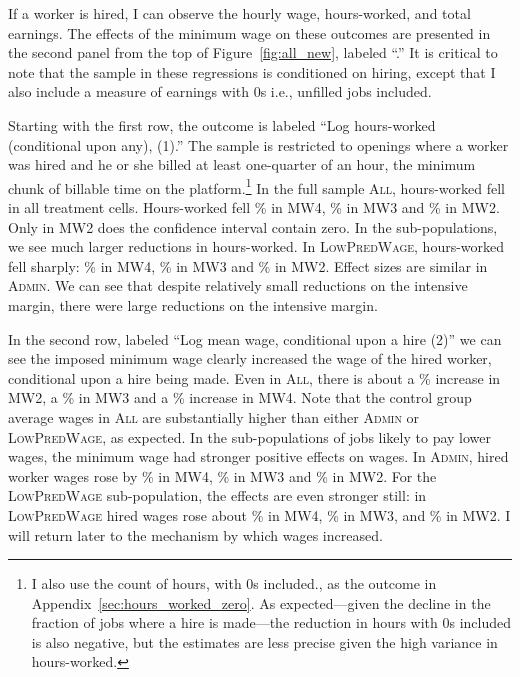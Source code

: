 \documentclass[AER]{AEA}
\newcommand{\all}{\textsc{All}}
\newcommand{\admin}{\textsc{Admin}}
\newcommand{\lpw}{\textsc{LowPredWage}}
\begin{document}
If a worker is hired, I can observe the hourly wage, hours-worked, and total earnings.
The effects of the minimum wage on these outcomes are presented in the second panel from the top of Figure~\ref{fig:all_new}, labeled ``\panelB{}.''
It is critical to note that the sample in these regressions is conditioned on hiring, except that I also include a measure of earnings with 0s i.e., unfilled jobs included.

Starting with the first row, the outcome is labeled ``Log hours-worked (conditional upon any), (1).'' 
The sample is restricted to openings where a worker was hired and he or she billed at least one-quarter of an hour, the minimum chunk of billable time on the platform.\footnote{ 
  I also use the count of hours, with 0s included., as the outcome in Appendix~\ref{sec:hours_worked_zero}.
  As expected---given the decline in the fraction of jobs where a hire is made---the reduction in hours with 0s included is also negative, but the estimates are less precise given the high variance in hours-worked.
}
In the full sample \all{}, hours-worked fell in all treatment cells.
Hours-worked fell \ALLFourloghourspctchange{}\% in MW4, \ALLThreeloghourspctchange{}\% in MW3 and \ALLTwologhourspctchange{}\% in MW2.
Only in MW2 does the confidence interval contain zero.
In the sub-populations, we see much larger reductions in hours-worked.
In \lpw{}, hours-worked fell sharply: \LPWFourloghourspctchange{}\% in MW4,
\LPWThreeloghourspctchange{}\% in MW3 and \LPWTwologhourspctchange{}\% in MW2.
Effect sizes are similar in \admin{}.
We can see that despite relatively small reductions on the intensive
margin, there were large reductions on the intensive margin.


In the second row, labeled ``Log mean wage, conditional upon a hire (2)'' we can see the imposed minimum wage clearly increased the wage of the hired worker, conditional upon a hire being made. 
Even in \all{}, there is about a \ALLTwologmeanwageovercontractpctchange{}\% increase in MW2, a \ALLThreelogmeanwageovercontractpctchange{}\% in MW3 and a \ALLFourlogmeanwageovercontractpctchange{}\% increase in MW4.
Note that the control group average wages in \all{} are substantially higher than either \admin{} or \lpw{}, as expected.
In the sub-populations of jobs likely to pay lower wages, the minimum wage had stronger positive effects on wages.
In \admin{}, hired worker wages rose by \ADMINFourlogmeanwageovercontractpctchange{}\% in MW4,
\ADMINThreelogmeanwageovercontractpctchange{}\% in MW3 and 
\ADMINTwologmeanwageovercontractpctchange{}\% in MW2.
For the \lpw{} sub-population, the effects are even stronger still: in \lpw{}
hired wages rose about \LPWFourlogmeanwageovercontractpctchange{}\% in MW4, \LPWThreelogmeanwageovercontractpctchange{}\%
in MW3, and \LPWTwologmeanwageovercontractpctchange{}\% in MW2.
I will return later to the mechanism by which wages increased.
\end{document}
